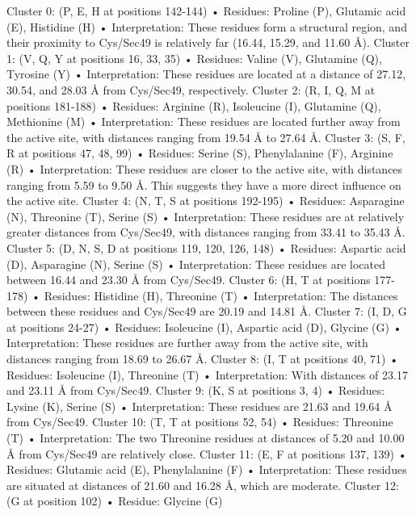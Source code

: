 \documentclass{article}
\begin{document}
Cluster 0: (P, E, H at positions 142-144)
    • Residues: Proline (P), Glutamic acid (E), Histidine (H)
    • Interpretation: These residues form a structural region, and their proximity to Cys/Sec49 is relatively far (16.44, 15.29, and 11.60 Å). 
Cluster 1: (V, Q, Y at positions 16, 33, 35)
    • Residues: Valine (V), Glutamine (Q), Tyrosine (Y)
    • Interpretation: These residues are located at a distance of 27.12, 30.54, and 28.03 Å from Cys/Sec49, respectively.
Cluster 2: (R, I, Q, M at positions 181-188)
    • Residues: Arginine (R), Isoleucine (I), Glutamine (Q), Methionine (M)
    • Interpretation: These residues are located further away from the active site, with distances ranging from 19.54 Å to 27.64 Å. 
Cluster 3: (S, F, R at positions 47, 48, 99)
    • Residues: Serine (S), Phenylalanine (F), Arginine (R)
    • Interpretation: These residues are closer to the active site, with distances ranging from 5.59 to 9.50 Å. This suggests they have a more direct influence on the active site. 
Cluster 4: (N, T, S at positions 192-195)
    • Residues: Asparagine (N), Threonine (T), Serine (S)
    • Interpretation: These residues are at relatively greater distances from Cys/Sec49, with distances ranging from 33.41 to 35.43 Å. 
Cluster 5: (D, N, S, D at positions 119, 120, 126, 148)
    • Residues: Aspartic acid (D), Asparagine (N), Serine (S)
    • Interpretation: These residues are located between 16.44 and 23.30 Å from Cys/Sec49. 
Cluster 6: (H, T at positions 177-178)
    • Residues: Histidine (H), Threonine (T)
    • Interpretation: The distances between these residues and Cys/Sec49 are 20.19 and 14.81 Å.
Cluster 7: (I, D, G at positions 24-27)
    • Residues: Isoleucine (I), Aspartic acid (D), Glycine (G)
    • Interpretation: These residues are further away from the active site, with distances ranging from 18.69 to 26.67 Å.
Cluster 8: (I, T at positions 40, 71)
    • Residues: Isoleucine (I), Threonine (T)
    • Interpretation: With distances of 23.17 and 23.11 Å from Cys/Sec49.
Cluster 9: (K, S at positions 3, 4)
    • Residues: Lysine (K), Serine (S)
    • Interpretation: These residues are 21.63 and 19.64 Å from Cys/Sec49. 
Cluster 10: (T, T at positions 52, 54)
    • Residues: Threonine (T)
    • Interpretation: The two Threonine residues at distances of 5.20 and 10.00 Å from Cys/Sec49 are relatively close. 
Cluster 11: (E, F at positions 137, 139)
    • Residues: Glutamic acid (E), Phenylalanine (F)
    • Interpretation: These residues are situated at distances of 21.60 and 16.28 Å, which are moderate. 
Cluster 12: (G at position 102)
    • Residue: Glycine (G)
\end{document}
